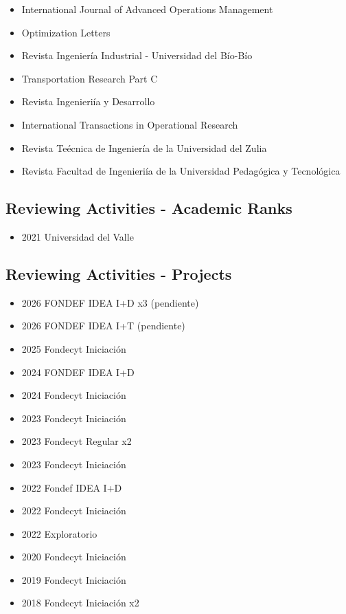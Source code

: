 {\begin{itemize}
\item International Journal of Advanced Operations Management
\item Optimization Letters
\item Revista Ingenier\'ia Industrial - Universidad del B\'io-B\'io
\item Transportation Research Part C
\end{itemize}
}

{\begin{itemize}
\item Revista Ingenieri\'ia y Desarrollo
\item International Transactions in Operational Research
\item Revista Te\'ecnica de Ingenier\'ia de la Universidad del Zulia
\end{itemize}
}

{\begin{itemize}
\item Revista Facultad de Ingenieri\'ia de la Universidad Pedag\'ogica y Tecnol\'ogica
\end{itemize}
}
\clearpage

\subsection{Reviewing Activities - Academic Ranks}

{\begin{itemize}
\item 2021 Universidad del Valle
\end{itemize}
}

\subsection{Reviewing Activities - Projects}

{\begin{itemize}
\item 2026 FONDEF IDEA I+D x3 (pendiente)
\item 2026 FONDEF IDEA I+T (pendiente)
\item 2025 Fondecyt Iniciaci\'on
\item 2024 FONDEF IDEA I+D
\item 2024 Fondecyt Iniciaci\'on
\item 2023 Fondecyt Iniciaci\'on
\item 2023 Fondecyt Regular x2
\item 2023 Fondecyt Iniciaci\'on
\item 2022 Fondef IDEA I+D
\item 2022 Fondecyt Iniciaci\'on
\item 2022 Exploratorio
\item 2020 Fondecyt Iniciaci\'on
\item 2019 Fondecyt Iniciaci\'on
\item 2018 Fondecyt Iniciaci\'on x2
\end{itemize}
}

